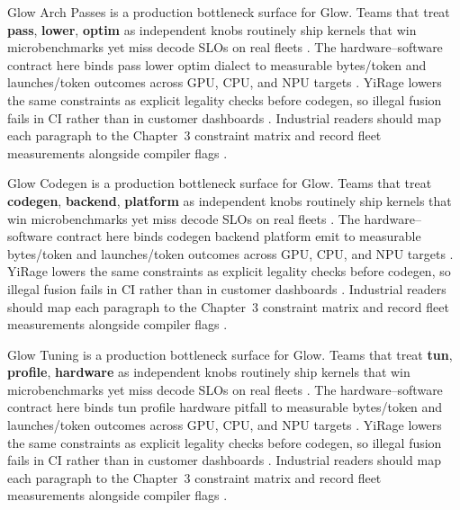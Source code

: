 Glow Arch Passes is a production bottleneck surface for Glow. Teams that treat \textbf{pass}, \textbf{lower}, \textbf{optim} as independent knobs routinely ship kernels that win microbenchmarks yet miss decode SLOs on real fleets \citep{taxbreak2026,semianalysis2024tma}. The hardware--software contract here binds pass lower optim dialect to measurable bytes/token and launches/token outcomes across GPU, CPU, and NPU targets \citep{memoryfloor2026,amd2024xdna}. YiRage lowers the same constraints as explicit legality checks before codegen, so illegal fusion fails in CI rather than in customer dashboards \citep{nvidia2022hopper,amd2024aie}. Industrial readers should map each paragraph to the Chapter~3 constraint matrix and record fleet measurements alongside compiler flags \citep{semianalysis2024tma,dlbook}.

Glow Codegen is a production bottleneck surface for Glow. Teams that treat \textbf{codegen}, \textbf{backend}, \textbf{platform} as independent knobs routinely ship kernels that win microbenchmarks yet miss decode SLOs on real fleets \citep{memoryfloor2026,amd2024xdna}. The hardware--software contract here binds codegen backend platform emit to measurable bytes/token and launches/token outcomes across GPU, CPU, and NPU targets \citep{nvidia2022hopper,amd2024aie}. YiRage lowers the same constraints as explicit legality checks before codegen, so illegal fusion fails in CI rather than in customer dashboards \citep{semianalysis2024tma,dlbook}. Industrial readers should map each paragraph to the Chapter~3 constraint matrix and record fleet measurements alongside compiler flags \citep{amd2024xdna,dao2022flashattention}.

Glow Tuning is a production bottleneck surface for Glow. Teams that treat \textbf{tun}, \textbf{profile}, \textbf{hardware} as independent knobs routinely ship kernels that win microbenchmarks yet miss decode SLOs on real fleets \citep{nvidia2022hopper,amd2024aie}. The hardware--software contract here binds tun profile hardware pitfall to measurable bytes/token and launches/token outcomes across GPU, CPU, and NPU targets \citep{semianalysis2024tma,dlbook}. YiRage lowers the same constraints as explicit legality checks before codegen, so illegal fusion fails in CI rather than in customer dashboards \citep{amd2024xdna,dao2022flashattention}. Industrial readers should map each paragraph to the Chapter~3 constraint matrix and record fleet measurements alongside compiler flags \citep{amd2024aie,kwon2023vllm}.

